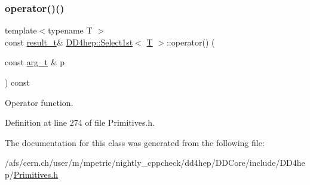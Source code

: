 \subsubsection{\texorpdfstring{operator()()}{operator()()}}
{\footnotesize\ttfamily template$<$typename T $>$ \\
const \hyperlink{class_d_d4hep_1_1_select1st_a39139f045fd65227afbed9a441a5eaea}{result\+\_\+t}\& \hyperlink{class_d_d4hep_1_1_select1st}{D\+D4hep\+::\+Select1st}$<$ \hyperlink{class_t}{T} $>$\+::operator() (\begin{DoxyParamCaption}\item[{const \hyperlink{class_d_d4hep_1_1_select1st_a271f38874bb7bcaf5867dc6d4ad356d1}{arg\+\_\+t} \&}]{p }\end{DoxyParamCaption}) const\hspace{0.3cm}{\ttfamily [inline]}}



Operator function. 



Definition at line 274 of file Primitives.\+h.



The documentation for this class was generated from the following file\+:\begin{DoxyCompactItemize}
\item 
/afs/cern.\+ch/user/m/mpetric/nightly\+\_\+cppcheck/dd4hep/\+D\+D\+Core/include/\+D\+D4hep/\hyperlink{_primitives_8h}{Primitives.\+h}\end{DoxyCompactItemize}

